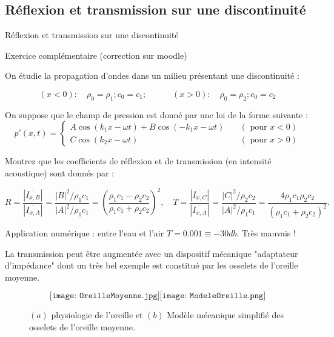 \subsection{Réflexion et transmission sur une discontinuité}
\begin{frame}{Réflexion et transmission sur une discontinuité}

\small

Exercice complémentaire (correction sur moodle)

On étudie la propagation d'ondes dans un milieu présentant une discontinuité :

$$
(x<0 ) : \quad \rho_0 = \rho_1 ; c_0 = c_1 ; \quad \qquad (x>0 ) : \quad  \rho_0 = \rho_2 ; c_0 = c_2
$$

On suppose que le champ de pression est donné par une loi de la forme suivante :
\begin{equation}
p'(x,t) = \left\{ \begin{array}{ll} 
A \cos (k_1 x - \omega t) + B \cos(-k_1 x - \omega t) & \quad ( \mbox{ pour }  x<0) \\
C \cos (k_2 x - \omega t) & \quad ( \mbox{ pour }  x>0) 
\end{array}
\right.
\label{eq:ABC}
\end{equation}


Montrez que les coefficients de réflexion et de transmission (en intensité acoustique) sont donnés par :

\begin{equation}
R = \frac{|\overline{I_{x,B}}|}{|\overline{I_{x,A}}|} =   \frac{|B|^2/\rho_1 c_1}{|A|^2/\rho_1 c_1} = \left(\frac{\rho_1 c_1 - \rho_2 c_2}{\rho_1 c_1 + \rho_2 c_2}\right)^2,
\quad
T =  \frac{|\overline{I_{x,C}}|}{|\overline{I_{x,A}}|} =  \frac{|C|^2/\rho_2 c_2}{|A|^2/ \rho_1 c_1}    = \frac{4 \rho_1 c_1\rho_2 c_2}{(\rho_1 c_1 + \rho_2 c_2)^2}.
\label{eq:RT}
\end{equation}

\pause

Application numérique : entre l'eau et l'air $T = 0.001  \equiv -30 db$. Très mauvais !

\pause

La transmission peut être augmentée avec un dispositif mécanique "adaptateur d'impédance" dont un très bel exemple est constitué par les osselets de l'oreille moyenne.

\begin{figure}
$$
\texttt{[image: OreilleMoyenne.jpg]}
\texttt{[image: ModeleOreille.png]}
$$
\caption{$(a)$ physiologie de l'oreille et $(b)$ Modèle mécanique simplifié des osselets de l'oreille moyenne.}
\end{figure}


\end{frame}



